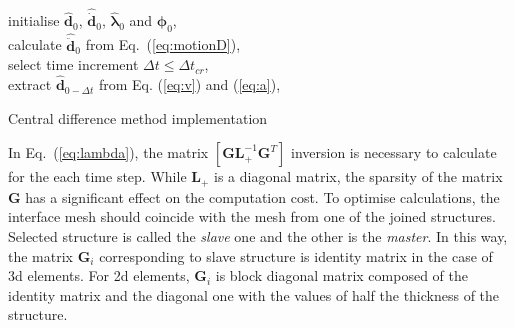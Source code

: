 \begin{algorithm}[H]
	\SetAlgoLined
	initialise  \(\widehat{\textbf{d}}_0\), \(\widehat{\dot{\textbf{d}}}_0\), \(\widehat{\boldsymbol{\lambda}}_0\) and \(\boldsymbol{\phi}_{0}\),\\
	calculate \(\widehat{\ddot{\textbf{d}}}_0\) from Eq.~(\ref{eq:motionD}),\\
	select time increment \(\Delta t\leq\Delta t_{cr}\),\\
	extract \(\widehat{\textbf{d}}_{0-\Delta t}\) from Eq. (\ref{eq:v}) and (\ref{eq:a}),\\
	\caption{Central difference method implementation}
	\label{alg:cdm}
\end{algorithm}

In Eq.~(\ref{eq:lambda}), the matrix \(\left [\textbf{GL}_+^{-1}\textbf{G}^T\right ]\) inversion is necessary to calculate for the each time step.
While \(\textbf{L}_+\) is a diagonal matrix, the sparsity of the matrix \(\textbf{G}\) has a significant effect on the computation cost.
To optimise calculations, the interface mesh should coincide with the mesh from one of the joined structures.
Selected structure is called the \textit{slave} one and the other is the \textit{master}.
In this way, the matrix \(\mathbf{G}_i\) corresponding to slave structure is identity matrix in the case of \ac{3d} elements.
For \ac{2d} elements, \(\mathbf{G}_i\) is block diagonal matrix composed of the identity matrix and the diagonal one with the values of half the thickness of the structure.

